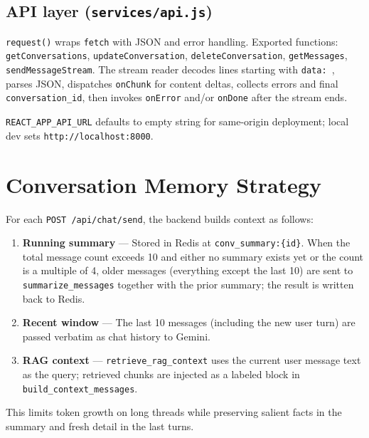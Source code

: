 \documentclass[11pt,a4paper]{article}
\begin{document}
\subsection{API layer (\texttt{services/api.js})}

\texttt{request()} wraps \texttt{fetch} with JSON and error handling. Exported functions: \texttt{getConversations}, \texttt{updateConversation}, \texttt{deleteConversation}, \texttt{getMessages}, \texttt{sendMessageStream}. The stream reader decodes lines starting with \texttt{data: }, parses JSON, dispatches \texttt{onChunk} for content deltas, collects errors and final \texttt{conversation\_id}, then invokes \texttt{onError} and/or \texttt{onDone} after the stream ends.

\texttt{REACT\_APP\_API\_URL} defaults to empty string for same-origin deployment; local dev sets \texttt{http://localhost:8000}.

\section{Conversation Memory Strategy}

For each \texttt{POST /api/chat/send}, the backend builds context as follows:

\begin{enumerate}[noitemsep]
  \item \textbf{Running summary} --- Stored in Redis at \texttt{conv\_summary:\{id\}}. When the total message count exceeds 10 and either no summary exists yet or the count is a multiple of 4, older messages (everything except the last 10) are sent to \texttt{summarize\_messages} together with the prior summary; the result is written back to Redis.
  \item \textbf{Recent window} --- The last 10 messages (including the new user turn) are passed verbatim as chat history to Gemini.
  \item \textbf{RAG context} --- \texttt{retrieve\_rag\_context} uses the current user message text as the query; retrieved chunks are injected as a labeled block in \texttt{build\_context\_messages}.
\end{enumerate}

This limits token growth on long threads while preserving salient facts in the summary and fresh detail in the last turns.

\end{document}
